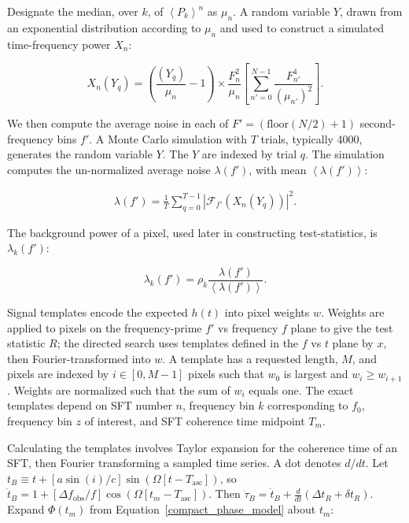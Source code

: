 \noindent Designate the median, over $k$, of $\left<P_k\right>^n$ as $\mu_n$.
A random variable $Y$, drawn from an exponential distribution according to $\mu_n$ and used to construct a simulated time-frequency power $X_n$:

\begin{equation}
X_n(Y_q) = \left(\frac{(Y_q)}{\mu_n} - 1 \right) \times \frac{F_n^2}{\mu_n} \left[ \sum\limits_{n'=0}^{N-1} \frac{F_{n'}^4}{(\mu_{n'})^2} \right].
\end{equation}

\noindent We then compute the average noise in each of $F' = (\mathrm{floor}(N/2) +1)$ second-frequency bins $f'$.
A Monte Carlo simulation with $T$ trials, typically 4000, generates the random variable $Y$.
The $Y$ are indexed by trial $q$.  
The simulation computes the un-normalized average noise $\lambda(f')$, with mean $\left< \lambda(f') \right>$:

\begin{eqnarray}
\lambda(f') = \frac{1}{T} \sum_{q=0}^{T-1}|\mathcal{F}_{f'}\left(X_n (Y_q)\right)|^2.
\end{eqnarray}

\noindent The background power of a pixel, used later in constructing test-statistics, is $\lambda_k(f')$:

\begin{equation}
\lambda_k(f') = \rho_k \frac{\lambda(f')}{\left< \lambda(f') \right>}.
\end{equation}

Signal templates encode the expected $h(t)$ into pixel weights $w$. 
Weights are applied to pixels on the frequency-prime $f'$ vs frequency $f$ plane to give the test statistic $R$; the directed search uses templates defined in the $f$ vs $t$ plane by $x$, then Fourier-transformed into $w$. 
A template has a requested length, $M$, and pixels are indexed by $i \in [0,M-1]$ pixels such that $w_0$ is largest and $w_i \geq w_{i+1}$.
Weights are normalized such that the sum of $w_i$ equals one.
The exact templates depend on SFT number $n$, frequency bin $k$ corresponding to $f_0$, frequency bin $z$ of interest, and SFT coherence time midpoint $T_m$.

Calculating the templates involves Taylor expansion for the coherence time of an SFT, then Fourier transforming a sampled time series.
A dot denotes $d/dt$.
Let $t_B \equiv t + [a \sin (i)/c]\sin(\Omega[t-T_\mathrm{asc}])$, so $\dot{t}_B = 1 + [\Delta f_\mathrm{obs}/f] \cos(\Omega [t_m-T_\mathrm{asc}])$.
Then $\dot{\tau}_B = \dot{t}_B + \frac{d}{dt}(\Delta t_R +\delta t_R)$.
Expand $\Phi(t_m)$ from Equation~\ref{compact_phase_model} about $t_m$:

